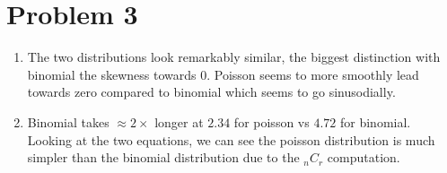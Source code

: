 \documentclass{article}
\begin{document}
\pagebreak

\section*{Problem 3}
\begin{enumerate}[label=\alph*)]
    \item The two distributions look remarkably similar, the biggest distinction with binomial the skewness towards 0. Poisson seems to more smoothly lead towards zero compared to binomial which seems to go sinusodially.
    \item Binomial takes \(\approx 2 \times\) longer at \(2.34\) for poisson vs \(4.72\) for binomial.
          Looking at the two equations, we can see the poisson distribution is much simpler than the binomial distribution due to the \(_{n}C_r\) computation.
\end{enumerate}

\pagebreak
\end{document}
